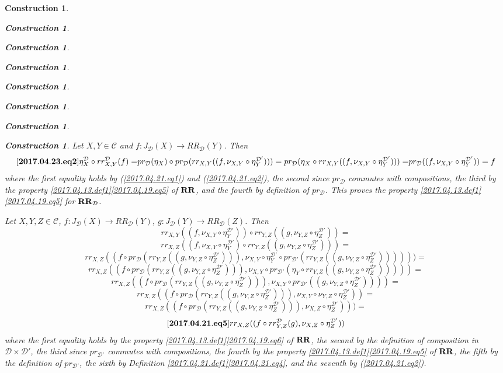 \documentclass[12pt]{amsart}
\newenvironment{eq}{\begin{equation}}{\end{equation}}
\newtheorem{construction}[proposition]{Construction}
\newcommand{\llabel}[1]{\label{#1}[{\bf #1}]}
\newcommand{\sr}{\rightarrow}
\newcommand{\RR}{{\bf RR}}
\newcommand{\C}{{\mathcal C}}
\newcommand{\D}{{\mathcal D}}
\begin{document}
\begin{construction}
\begin{construction}
\begin{construction}
\begin{construction}
\begin{construction}
\begin{construction}
\begin{construction}
\begin{construction}
Let $X,Y\in\C$ and $f:J_{\D}(X)\sr RR_{\D}(Y)$. Then
%
\begin{eq}
\llabel{2017.04.23.eq2}
\eta^{\D}_X\circ rr^{\D}_{X,Y}(f)=
$$$$pr_{\D}(\eta_X)\circ pr_{\D}(rr_{X,Y}((f,\nu_{X,Y}\circ \eta^{\D'}_Y)))=
pr_{\D}(\eta_X\circ rr_{X,Y}((f,\nu_{X,Y}\circ \eta^{\D'}_Y)))=
$$$$pr_{\D}((f,\nu_{X,Y}\circ \eta^{\D'}_Y))=
f
\end{eq}
%
where the first equality holds by (\ref{2017.04.21.eq1}) and (\ref{2017.04.21.eq2}), the second since $pr_{\D}$ commutes with compositions, the third by the property \ref{2017.04.13.def1}\ref{2017.04.19.eq5} of $\RR$, and the fourth by definition of $pr_{\D}$. This proves the property \ref{2017.04.13.def1}\ref{2017.04.19.eq5} for $\RR_{\D}$. 

Let $X,Y,Z\in\C$, $f:J_{\D}(X)\sr RR_{\D}(Y)$, $g:J_{\D}(Y)\sr RR_{\D}(Z)$. Then
%
$$rr_{X,Y}((f,\nu_{X,Y}\circ \eta^{\D'}_Y))\circ 
rr_{Y,Z}((g,\nu_{Y,Z}\circ \eta^{\D'}_Z))=
%
$$$$rr_{X,Z}((f,\nu_{X,Y}\circ \eta^{\D'}_Y)\circ rr_{Y,Z}((g,\nu_{Y,Z}\circ \eta^{\D'}_Z)))=
%
$$$$rr_{X,Z}((f\circ pr_{\D}(rr_{Y,Z}((g,\nu_{Y,Z}\circ \eta^{\D'}_Z))),\nu_{X,Y}\circ\eta^{\D'}_Y\circ pr_{\D'}(rr_{Y,Z}((g,\nu_{Y,Z}\circ\eta^{\D'}_Z))) )))=
%
$$$$rr_{X,Z}((f\circ pr_{\D}(rr_{Y,Z}((g,\nu_{Y,Z}\circ \eta^{\D'}_Z))),\nu_{X,Y}\circ pr_{\D'}(\eta_Y\circ rr_{Y,Z}((g,\nu_{Y,Z}\circ\eta^{\D'}_Z))) ))=
%
$$$$rr_{X,Z}((f\circ pr_{\D}(rr_{Y,Z}((g,\nu_{Y,Z}\circ \eta^{\D'}_Z))),\nu_{X,Y}\circ pr_{\D'}((g,\nu_{Y,Z}\circ\eta^{\D'}_Z)) ))=
%
$$$$rr_{X,Z}((f\circ pr_{\D}(rr_{Y,Z}((g,\nu_{Y,Z}\circ \eta^{\D'}_Z))),\nu_{X,Y}\circ\nu_{Y,Z}\circ\eta^{\D'}_Z) )=
%
$$$$rr_{X,Z}((f\circ pr_{\D}(rr_{Y,Z}((g,\nu_{Y,Z}\circ \eta^{\D'}_Z))),\nu_{X,Z}\circ\eta^{\D'}_Z) ))=$$
%
\begin{eq}
\llabel{2017.04.21.eq5}
rr_{X,Z}((f\circ rr^{\D}_{Y,Z}(g),\nu_{X,Z}\circ\eta^{\D'}_Z))
\end{eq}
%
where the first equality holds by the property \ref{2017.04.13.def1}\ref{2017.04.19.eq6} of $\RR$, the second by the definition of composition in $\D\times\D'$, the third since $pr_{\D'}$ commutes with compositions, the fourth by the  
property \ref{2017.04.13.def1}\ref{2017.04.19.eq5} of $\RR$, the fifth by the definition of $pr_{\D'}$, the sixth by Definition \ref{2017.04.21.def1}\ref{2017.04.21.eq4}, and the seventh by (\ref{2017.04.21.eq2}). 


\end{construction}
\end{construction}
\end{construction}
\end{construction}
\end{construction}
\end{construction}
\end{construction}
\end{construction}
\end{document}
